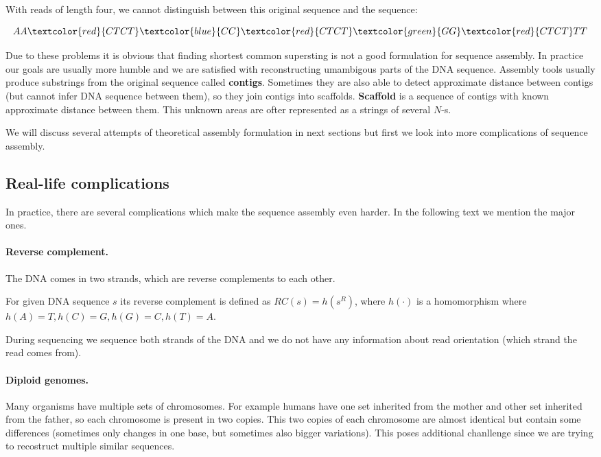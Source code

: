 With reads of length four, we cannot distinguish between this original sequence and
the sequence:

$$AA\textcolor{red}{CTCT}\textcolor{blue}{CC}\textcolor{red}{CTCT}\textcolor{green}{GG}\textcolor{red}{CTCT}TT$$

Due to these problems it is obvious that finding shortest common supersting
is not a good formulation for sequence assembly. 
In practice our goals are usually more humble and we are satisfied with reconstructing
umambigous parts of the DNA sequence. Assembly tools
usually produce substrings from the original sequence called {\bf contigs}.
Sometimes they are also able to detect approximate distance between contigs
(but cannot infer DNA sequence between them), so they join
contigs into scaffolds. {\bf Scaffold} is a sequence of contigs with known
approximate distance between them. 
This unknown areas are ofter represented as a strings of several $N$-s.

We will discuss several attempts of theoretical assembly formulation in
next sections but first we look into more complications of sequence assembly.

\subsection{Real-life complications}

In practice, there are several complications which make the sequence assembly even harder.
In the following text we mention the major ones.

\paragraph{Reverse complement.} 
The DNA comes in two strands, which are reverse complements to each other.

\begin{definition}
For given DNA sequence $s$ its reverse complement is defined as
$RC(s) = h(s^R)$, where $h(\cdot)$ is a homomorphism where $h(A) = T, h(C) = G,
h(G) = C, h(T) = A$. 
\end{definition}

During sequencing we sequence both strands of the DNA and we do not have
any information about read orientation (which strand the read comes from).

\paragraph{Diploid genomes.}
Many organisms have multiple sets of chromosomes. For example humans have one set
inherited from the mother and other set inherited from the father, so each chromosome
is present in two copies. This two copies of each chromosome are almost identical but
contain some differences (sometimes only changes in one base, but sometimes also
bigger variations). This poses additional chanllenge since we are trying to recostruct
multiple similar sequences.

